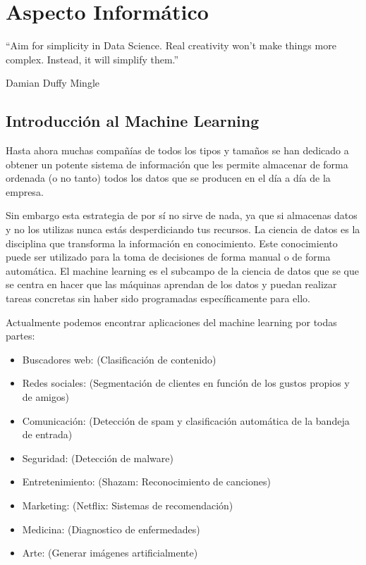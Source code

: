 \lstset{language=Python} 

\chapter{Aspecto Informático}

\epigraph{“Aim for simplicity in Data Science. Real creativity won’t make things more complex. Instead, it will simplify them.”}{Damian Duffy Mingle}



\section{Introducción al Machine Learning}

Hasta ahora muchas compañías de todos los tipos y tamaños se han dedicado a obtener un potente sistema de información que les permite almacenar de forma ordenada (o no tanto) todos los datos que se producen en el día a día de la empresa.  

Sin embargo esta estrategia de por sí no sirve de nada, ya que si almacenas datos y no los utilizas nunca estás desperdiciando tus recursos.  
La ciencia de datos es la disciplina que transforma la información en conocimiento.  
Este conocimiento puede ser utilizado para la toma de decisiones de forma manual o de forma automática.  
El machine learning es el subcampo de la ciencia de datos que se que se centra en hacer que las máquinas aprendan de los datos y puedan realizar 
tareas concretas sin haber sido programadas específicamente para ello.

Actualmente podemos encontrar aplicaciones del machine learning por todas partes:

\begin{itemize}
\item Buscadores web: (Clasificación de contenido)
\item Redes sociales: (Segmentación de clientes en función de los gustos propios y de amigos)
\item Comunicación: (Detección de spam y clasificación automática de la bandeja de entrada)
\item Seguridad: (Detección de malware)
\item Entretenimiento: (Shazam: Reconocimiento de canciones)
\item Marketing: (Netflix: Sistemas de recomendación)
\item Medicina: (Diagnostico de enfermedades)
\item Arte: (Generar imágenes artificialmente) 
\end{itemize}

